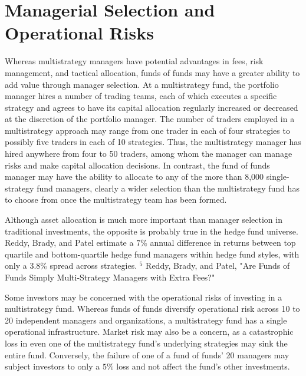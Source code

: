 \documentclass[11pt]{article}
\begin{document}
\section*{Managerial Selection and Operational Risks}
Whereas multistrategy managers have potential advantages in fees, risk management, and tactical allocation, funds of funds may have a greater ability to add value through manager selection. At a multistrategy fund, the portfolio manager hires a number of trading teams, each of which executes a specific strategy and agrees to have its capital allocation regularly increased or decreased at the discretion of the portfolio manager. The number of traders employed in a multistrategy approach may range from one trader in each of four strategies to possibly five traders in each of 10 strategies. Thus, the multistrategy manager has hired anywhere from four to 50 traders, among whom the manager can manage risks and make capital allocation decisions. In contrast, the fund of funds manager may have the ability to allocate to any of the more than 8,000 single-strategy fund managers, clearly a wider selection than the multistrategy fund has to choose from once the multistrategy team has been formed.

Although asset allocation is much more important than manager selection in traditional investments, the opposite is probably true in the hedge fund universe. Reddy, Brady, and Patel estimate a $7 \%$ annual difference in returns between top quartile and bottom-quartile hedge fund managers within hedge fund styles, with only a 3.8\% spread across strategies. ${ }^{5}$ Reddy, Brady, and Patel, "Are Funds of Funds Simply Multi-Strategy Managers with Extra Fees?"

Some investors may be concerned with the operational risks of investing in a multistrategy fund. Whereas funds of funds diversify operational risk across 10 to 20 independent managers and organizations, a multistrategy fund has a single operational infrastructure. Market risk may also be a concern, as a catastrophic loss in even one of the multistrategy fund's underlying strategies may sink the entire fund. Conversely, the failure of one of a fund of funds' 20 managers may subject investors to only a $5 \%$ loss and not affect the fund's other investments.
\end{document}
